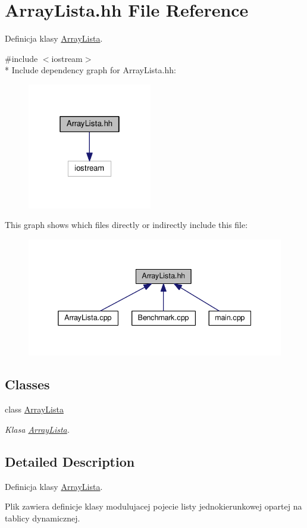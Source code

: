 \hypertarget{a00008}{}\section{Array\+Lista.\+hh File Reference}
\label{a00008}


Definicja klasy \hyperlink{a00001}{Array\+Lista}.  


{\ttfamily \#include $<$iostream$>$}\\*
Include dependency graph for Array\+Lista.\+hh\+:\nopagebreak
\begin{figure}[H]
\begin{center}
\leavevmode
\includegraphics[width=154pt]{a00023}
\end{center}
\end{figure}
This graph shows which files directly or indirectly include this file\+:\nopagebreak
\begin{figure}[H]
\begin{center}
\leavevmode
\includegraphics[width=338pt]{a00024}
\end{center}
\end{figure}
\subsection*{Classes}
\begin{DoxyCompactItemize}
\item 
class \hyperlink{a00001}{Array\+Lista}
\begin{DoxyCompactList}\small\item\em Klasa \hyperlink{a00001}{Array\+Lista}. \end{DoxyCompactList}\end{DoxyCompactItemize}


\subsection{Detailed Description}
Definicja klasy \hyperlink{a00001}{Array\+Lista}. 

Plik zawiera definicje klasy modulujacej pojecie listy jednokierunkowej opartej na tablicy dynamicznej. 